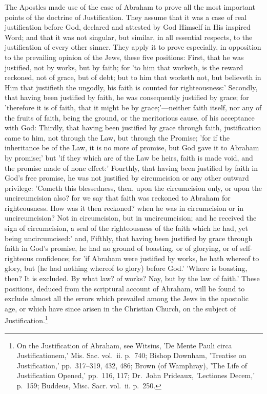 \documentclass[
]{book}
\begin{document}
The Apostles made use of the case of Abraham to prove all the most important points of the doctrine of Justification. They assume that it was a case of real justification before God, declared and attested by God Himself in His inspired Word; and that it was not singular, but similar, in all essential respects, to the justification of every other sinner. They apply it to prove especially, in opposition to the prevailing opinion of the Jews, these five positions: First, that he was justified, not by works, but by faith; for 'to him that worketh, is the reward reckoned, not of grace, but of debt; but to him that worketh not, but believeth in Him that justifieth the ungodly, his faith is counted for righteousness:' Secondly, that having been justified by faith, he was consequently justified by grace; for 'therefore it is of faith, that it might be by grace;'---neither faith itself, nor any of the fruits of faith, being the ground, or the meritorious cause, of his acceptance with God: Thirdly, that having been justified by grace through faith, justification came to him, not through the Law, but through the Promise; 'for if the inheritance be of the Law, it is no more of promise, but God gave it to Abraham by promise;' but 'if they which are of the Law be heirs, faith is made void, and the promise made of none effect:' Fourthly, that having been justified by faith in God's free promise, he was not justified by circumcision or any other outward privilege: 'Cometh this blessedness, then, upon the circumcision only, or upon the uncircumcision also? for we say that faith was reckoned to Abraham for righteousness. How was it then reckoned? when he was in circumcision or in uncircumcision? Not in circumcision, but in uncircumcision; and he received the sign of circumcision, a seal of the righteousness of the faith which he had, yet being uncircumcised:' and, Fifthly, that having been justified by grace through faith in God's promise, he had no ground of boasting, or of glorying, or of self-righteous confidence; for 'if Abraham were justified by works, he hath whereof to glory, but (he had nothing whereof to glory) before God.' 'Where is boasting, then? It is excluded. By what law? of works? Nay, but by the law of faith.' These positions, deduced from the scriptural account of Abraham, will be found to exclude almost all the errors which prevailed among the Jews in the apostolic age, or which have since arisen in the Christian Church, on the subject of Justification.\footnote{On the Justification of Abraham, see Witsius, 'De Mente Pauli circa Justificationem,' Mis. Sac. vol.~ii. p.~740; Bishop Downham, 'Treatise on Justification,' pp.~317--319, 432, 486; Brown (of Wamphray), 'The Life of Justification Opened,' pp.~116, 117; Dr.~John Prideaux, 'Lectiones Decem,' p.~159; Buddeus, Misc. Sacr. vol.~ii. p.~250.}
\end{document}

